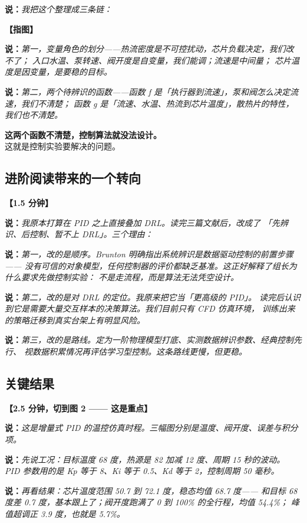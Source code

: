 \documentclass[11pt,a4paper]{ctexart}
\newcommand{\shuo}[1]{\par{\color{cBlue}\bfseries 说：}{\itshape #1}\par}
\newcommand{\dongzuo}[1]{\par{\color{cWarnLine}\bfseries 【#1】}\par}
\begin{document}
\shuo{我把这个整理成三条链：}

\dongzuo{指图}

\shuo{第一，变量角色的划分——热流密度是不可控扰动，芯片负载决定，我们改不了；
入口水温、泵转速、阀开度是自变量，我们能调；流速是中间量；
芯片温度是因变量，是要稳的目标。}

\shuo{第二，两个待辨识的函数——函数 f 是「执行器到流速」，泵和阀怎么决定流速，我们不清楚；
函数 g 是「流速、水温、热流到芯片温度」，散热片的特性，我们也不清楚。}

\begin{yaodian}
\textbf{这两个函数不清楚，控制算法就没法设计。}\\
这就是控制实验要解决的问题。
\end{yaodian}

\subsection{进阶阅读带来的一个转向}

\dongzuo{1.5 分钟}

\shuo{我原本打算在 PID 之上直接叠加 DRL。读完三篇文献后，改成了
「先辨识、后控制、暂不上 DRL」。三个理由：}

\shuo{第一，改的是顺序。Brunton 明确指出系统辨识是数据驱动控制的前置步骤——
没有可信的对象模型，任何控制器的评价都缺乏基准。这正好解释了组长为什么要求先做控制实验：
不是走流程，而是算法无法凭空设计。}

\shuo{第二，改的是对 DRL 的定位。我原来把它当「更高级的 PID」。
读完后认识到它是需要大量交互样本的决策算法。我们目前只有 CFD 仿真环境，
训练出来的策略迁移到真实台架上有明显风险。}

\shuo{第三，改的是路线。定为一阶物理模型打底、实测数据辨识参数、经典控制先行、
视数据积累情况再评估学习型控制。这条路线更慢，但更稳。}

\subsection{关键结果}

\dongzuo{2.5 分钟，切到图 2 —— 这是重点}

\shuo{这是增量式 PID 的温控仿真时程。三幅图分别是温度、阀开度、误差与积分项。}

\shuo{先说工况：目标温度 68 度，热源是 82 加减 12 度、周期 15 秒的波动。
PID 参数用的是 Kp 等于 8、Ki 等于 0.5、Kd 等于 2，控制周期 50 毫秒。}

\shuo{再看结果：芯片温度范围 50.7 到 72.1 度，稳态均值 68.7 度——
和目标 68 度差 0.7 度，基本跟上了；阀开度跑满了 0 到 100\% 的全行程，均值 54.4\%；
峰值超调正 3.9 度，也就是 5.7\%。}
\end{document}
